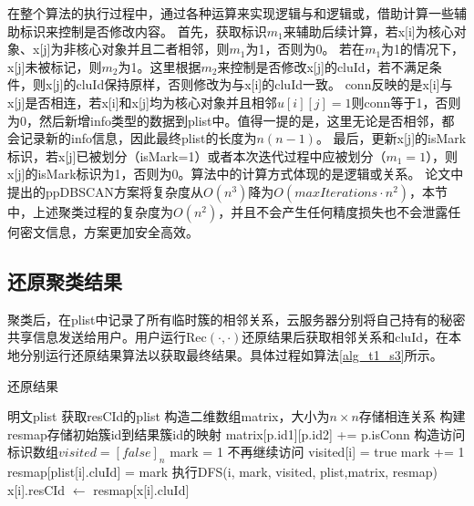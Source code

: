 在整个算法的执行过程中，通过各种运算来实现逻辑与和逻辑或，借助计算一些辅助标识来控制是否修改内容。
首先，获取标识$ m_1 $来辅助后续计算，若x[i]为核心对象、x[j]为非核心对象并且二者相邻，则$ m_1 $为1，否则为0。
若在$ m_1 $为1的情况下，x[j]未被标记，则$ m_2 $为1。这里根据$ m_2 $来控制是否修改x[j]的cluId，若不满足条件，则x[j]的cluId保持原样，否则修改为与x[i]的cluId一致。
conn反映的是x[i]与x[j]是否相连，若x[i]和x[j]均为核心对象并且相邻$ u[i][j]=1 $则conn等于1，否则为0，然后新增info类型的数据到plist中。值得一提的是，这里无论是否相邻，都会记录新的info信息，因此最终plist的长度为$ n(n-1) $。
最后，更新x[j]的isMark标识，若x[j]已被划分（isMark=1）或者本次迭代过程中应被划分（$ m_1 = 1 $），则x[j]的isMark标识为1，否则为0。算法中的计算方式体现的是逻辑或关系。
论文\cite{bozdemir2021privacy}中提出的ppDBSCAN方案将复杂度从$ O(n^3)$降为$ O(maxIterations \cdot n^2) $，本节中，上述聚类过程的复杂度为$ O(n^2) $，并且不会产生任何精度损失也不会泄露任何密文信息，方案更加安全高效。

\subsection{还原聚类结果}
\label{task1-huanyuan}
聚类后，在plist中记录了所有临时簇的相邻关系，云服务器分别将自己持有的秘密共享信息发送给用户。用户运行$ \text{Rec}(\cdot,\cdot) $还原结果后获取相邻关系和cluId，在本地分别运行还原结果算法以获取最终结果。具体过程如算法\ref{alg_t1_s3}所示。

\begin{algorithm}[htbp]
	\renewcommand{\algorithmicrequire}{\textbf{输入:}}
	\renewcommand{\algorithmicensure}{\textbf{输出:}}
	\caption{还原结果}
	\label{alg_t1_s3}
	\begin{algorithmic}[1]
		\REQUIRE 明文plist
		\ENSURE 获取resCId的plist
		\STATE 构造二维数组matrix，大小为$ n\times n $存储相连关系
		\STATE 构建resmap存储初始簇id到结果簇id的映射
		\STATE matrix[p.id1][p.id2] += p.isConn
		\ENDFOR
		\STATE 构造访问标识数组$ visited=[false]_n $
		\STATE mark = 1
		\STATE 不再继续访问
		\ENDIF
		\STATE visited[i] = true
		\STATE mark += 1
		\STATE resmap[plist[i].cluId] = mark
		\STATE 执行DFS(i, mark, visited, plist,matrix, resmap)
		\ENDFOR
		\STATE x[i].resCId $\leftarrow$ resmap[x[i].cluId]
		\ENDIF
		\ENDFOR
	\end{algorithmic}
\end{algorithm}

